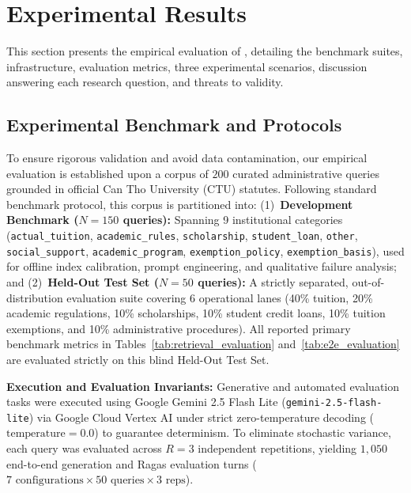 \section{Experimental Results}
\label{sec:exp}

This section presents the empirical evaluation of \system{}, detailing the benchmark suites, infrastructure, evaluation metrics, three experimental scenarios, discussion answering each research question, and threats to validity.

\subsection{Experimental Benchmark and Protocols}
\label{sec:dataset}

To ensure rigorous validation and avoid data contamination, our empirical evaluation is established upon a corpus of $200$ curated administrative queries grounded in official Can Tho University (CTU) statutes. Following standard benchmark protocol, this corpus is partitioned into: (1)~\textbf{Development Benchmark ($N=150$ queries):} Spanning 9 institutional categories (\texttt{actual\_tuition}, \texttt{academic\_rules}, \texttt{scholarship}, \texttt{student\_loan}, \texttt{other}, \texttt{social\_support}, \texttt{academic\_program}, \texttt{exemption\_policy}, \texttt{exemption\_basis}), used for offline index calibration, prompt engineering, and qualitative failure analysis; and (2)~\textbf{Held-Out Test Set ($N=50$ queries):} A strictly separated, out-of-distribution evaluation suite covering 6 operational lanes (40\% tuition, 20\% academic regulations, 10\% scholarships, 10\% student credit loans, 10\% tuition exemptions, and 10\% administrative procedures). All reported primary benchmark metrics in Tables~\ref{tab:retrieval_evaluation} and~\ref{tab:e2e_evaluation} are evaluated strictly on this blind Held-Out Test Set.

\noindent\textbf{Execution and Evaluation Invariants:} Generative and automated evaluation tasks were executed using Google Gemini 2.5 Flash Lite (\texttt{gemini-2.5-flash-lite}) via Google Cloud Vertex AI under strict zero-temperature decoding ($\text{temperature}=0.0$) to guarantee determinism. To eliminate stochastic variance, each query was evaluated across $R=3$ independent repetitions, yielding $1,050$ end-to-end generation and Ragas evaluation turns ($7\text{ configurations} \times 50\text{ queries} \times 3\text{ reps}$).


